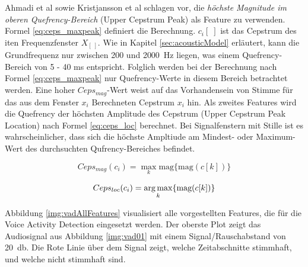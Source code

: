 Ahmadi et al \cite{vad_ceps} sowie Kristjansson et al\cite{vad_Lisboa} schlagen vor, die \emph{höchste Magnitude im oberen Quefrency-Bereich} (Upper Cepstrum Peak) als Feature zu verwenden. Formel \ref{eq:ceps_maxpeak} definiert die Berechnung. $c_i[\;]$ ist das Cepstrum des iten Frequenzfenster $X_[\;]$. Wie in Kapitel \ref{sec:acousticModel} erläutert, kann die Grundfrequenz nur zwischen 200 und \SI{2000}{\hertz} liegen, was einem Quefrency-Bereich von 5 - 40 ms entspricht. Folglich werden bei der Berechnung nach Formel \ref{eq:ceps_maxpeak} nur Quefrency-Werte in diesem Bereich betrachtet werden. Eine hoher $Ceps_{mag}$-Wert weist auf das Vorhandensein von Stimme für das aus dem Fenster $x_i$ Berechneten Cepstrum $x_i$ hin. Als zweites Features wird die Quefrency der höchsten Amplitude des Cepstrum (Upper Cepstrum Peak Location) nach Formel \ref{eq:ceps_loc} berechnet. Bei Signalfenstern mit Stille ist es wahrscheinlicher, dass sich die höchste Ampltiude am Mindest- oder Maximum-Wert des durchsuchten Qufrency-Bereiches befindet.

\begin{equation}
Ceps_{mag}(c_i) = \max_{k}\text{mag}\{\text{mag}(c[k])\}
\label{eq:ceps_maxpeak}
\end{equation}

\begin{equation}
Ceps_{loc}(c_i) = \operatorname*{arg\,max}_{k}\{\text{mag}(c[k])\}
\label{eq:ceps_loc}
\end{equation}


Abbildung \ref{img:vadAllFeatures} visualisiert alle vorgestellten Features, die für die Voice Activity Detection eingesetzt werden. Der oberste Plot zeigt das Audiosignal aus Abbildung \ref{img:vad01} mit einem Signal/Rauschabstand von \SI{20}{\decibel}. Die Rote Linie über dem Signal zeigt, welche Zeitabschnitte stimmhaft, und welche nicht stimmhaft sind.

